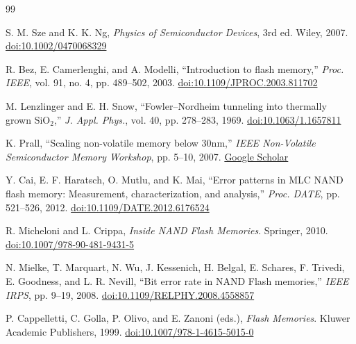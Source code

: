 \documentclass[11pt,a4paper,twoside]{article}
\theoremstyle{definition}
\theoremstyle{plain}
\theoremstyle{remark}
\begin{document}
\begin{thebibliography}{99}

S. M. Sze and K. K. Ng, \textit{Physics of Semiconductor Devices}, 3rd ed.
Wiley, 2007.
\href{https://doi.org/10.1002/0470068329}{doi:10.1002/0470068329}

R. Bez, E. Camerlenghi, and A. Modelli,
``Introduction to flash memory,''
\textit{Proc. IEEE}, vol. 91, no. 4, pp. 489--502, 2003.
\href{https://doi.org/10.1109/JPROC.2003.811702}{doi:10.1109/JPROC.2003.811702}

M. Lenzlinger and E. H. Snow,
``Fowler--Nordheim tunneling into thermally grown SiO$_2$,''
\textit{J. Appl. Phys.}, vol. 40, pp. 278--283, 1969.
\href{https://doi.org/10.1063/1.1657811}{doi:10.1063/1.1657811}

K. Prall,
``Scaling non-volatile memory below 30nm,''
\textit{IEEE Non-Volatile Semiconductor Memory Workshop}, pp. 5--10, 2007.
\href{https://scholar.google.com/scholar?q=Prall+scaling+non-volatile+memory+below+30nm}{Google Scholar}

Y. Cai, E. F. Haratsch, O. Mutlu, and K. Mai,
``Error patterns in MLC NAND flash memory: Measurement, characterization, and analysis,''
\textit{Proc. DATE}, pp. 521--526, 2012.
\href{https://doi.org/10.1109/DATE.2012.6176524}{doi:10.1109/DATE.2012.6176524}

R. Micheloni and L. Crippa,
\textit{Inside NAND Flash Memories}.
Springer, 2010.
\href{https://doi.org/10.1007/978-90-481-9431-5}{doi:10.1007/978-90-481-9431-5}

N. Mielke, T. Marquart, N. Wu, J. Kessenich, H. Belgal, E. Schares, F. Trivedi, E. Goodness, and L. R. Nevill,
``Bit error rate in NAND Flash memories,''
\textit{IEEE IRPS}, pp. 9--19, 2008.
\href{https://doi.org/10.1109/RELPHY.2008.4558857}{doi:10.1109/RELPHY.2008.4558857}

P. Cappelletti, C. Golla, P. Olivo, and E. Zanoni (eds.),
\textit{Flash Memories}.
Kluwer Academic Publishers, 1999.
\href{https://doi.org/10.1007/978-1-4615-5015-0}{doi:10.1007/978-1-4615-5015-0}

\end{thebibliography}
\end{document}
